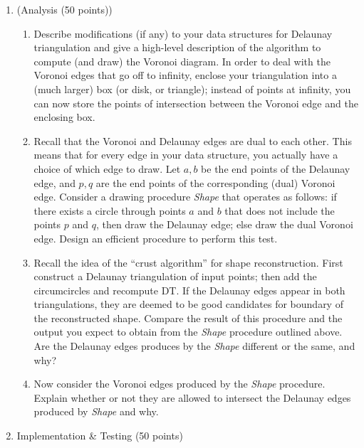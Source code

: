 \documentclass[11pt]{article}
\begin{document}
\begin{enumerate}

\item (Analysis (50 points))
\begin{enumerate}

\item
Describe modifications (if any) to your data structures for Delaunay
triangulation and give a high-level description of the algorithm to
compute  (and draw)  the Voronoi diagram.   In order to deal with   the Voronoi edges 
that go off to infinity, enclose your triangulation into a (much larger) box (or disk, 
or triangle);  instead of points at infinity,  you can now store the points of
intersection between the Voronoi edge and the enclosing box.  

\item
Recall that the Voronoi and Delaunay edges are dual to each other.  This means 
that for every edge in your data structure,  you actually have a choice of 
which edge to draw.   Let $a,b$ be the end points of the Delaunay edge, and 
$p, q$ are the end points of the corresponding (dual) Voronoi edge.  
Consider a drawing   procedure \emph{Shape} that  operates as follows:   if there 
exists a circle through points $a$ and $b$ that does not include the points $p$ 
and $q$,  then draw the Delaunay edge;  else draw the dual Voronoi edge.  Design an 
efficient procedure to perform this test. 

\item 
Recall the idea of the ``crust algorithm'' for shape reconstruction. 
First construct a Delaunay triangulation of input points;  then 
add the circumcircles and recompute DT.  If the Delaunay edges 
appear in both triangulations, they are deemed to be good candidates
for boundary of the reconstructed shape.  Compare  the result of this 
procedure and the output you expect to obtain from the \emph{Shape} procedure 
outlined above.   Are the Delaunay edges produces by the  \emph{Shape}  
different or the same,  and why?  

\item 
Now consider the Voronoi edges produced by the \emph{Shape} procedure.  
Explain whether or not they are allowed to intersect the Delaunay edges 
produced by \emph{Shape} and why.  


\end{enumerate}

\item Implementation \& Testing (50 points)

\begin{enumerate}


\end{enumerate}
\end{enumerate}
\end{document}
